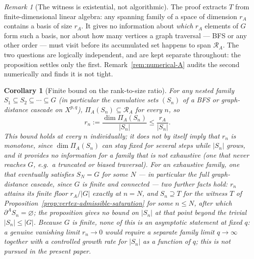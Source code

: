 \documentclass[11pt,a4paper]{article}
\theoremstyle{plain}
\newtheorem{corollary}[theorem]{Corollary}
\theoremstyle{definition}
\theoremstyle{remark}
\newtheorem{remark}[theorem]{Remark}
\newcommand{\PiA}{\Pi_A}
\newcommand{\dA}{\partial^A}
\begin{document}
      \begin{remark}[The witness is existential, not algorithmic]
        \label{rem:witness-existential}
        The proof extracts $T$ from finite-dimensional linear algebra: any spanning family of a
        space of dimension $r_A$ contains a basis of size $r_A$.
        It gives no information about \emph{which} $r_A$ elements of $G$ form such a basis, nor
        about how many vertices a graph traversal --- BFS or any other order --- must visit before
        its accumulated set happens to span $\mathcal{R}_A$.
        The two questions are logically independent, and are kept separate throughout: the
        proposition settles only the first.
        Remark~\ref{rem:numerical-A} audits the second numerically and finds it is not tight.
      \end{remark}

      \begin{corollary}[Finite bound on the rank-to-size ratio]
        \label{cor:productivity-bound}
        For any nested family $S_1 \subseteq S_2 \subseteq \cdots \subseteq G$ (in particular the
        cumulative sets $(S_n)$ of a BFS or graph-distance cascade on $X^{p,q}$), $\PiA(S_n) \subseteq
        \mathcal{R}_A$ for every $n$, so
        \begin{equation}
          \label{eq:rn-bound}
          r_n := \frac{\dim \PiA(S_n)}{|S_n|} \le \frac{r_A}{|S_n|}.
        \end{equation}
        This bound holds at every $n$ individually; it does not by itself imply that $r_n$ is
        monotone, since $\dim\PiA(S_n)$ can stay fixed for several steps while $|S_n|$ grows, and it
        provides no information for a family that is not exhaustive (one that never reaches $G$,
        e.g.\ a truncated or biased traversal).
        For an \emph{exhaustive} family, one that eventually satisfies $S_N = G$ for some $N$ ---
        in particular the full graph-distance cascade, since $G$ is finite and connected --- two
        further facts hold: $r_n$ attains its finite floor $r_A/|G|$ exactly at $n=N$, and
        $S_n \supseteq T$ for the witness $T$ of Proposition~\ref{prop:vertex-admissible-saturation}
        for some $n \le N$, after which $\dA S_n = \varnothing$; the proposition gives no bound on
        $|S_n|$ at that point beyond the trivial $|S_n| \le |G|$.
        Because $G$ is finite, none of this is an asymptotic statement at fixed $q$: a genuine
        vanishing limit $r_n \to 0$ would require a separate family limit $q \to \infty$ together
        with a controlled growth rate for $|S_n|$ as a function of $q$; this is not pursued in the
        present paper.
      \end{corollary}
\end{document}
